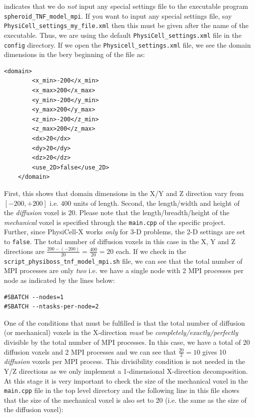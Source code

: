 \documentclass[12pt]{article}
\begin{document}
indicates that we do \textit{not} input any special settings file to the executable program \texttt{spheroid\_TNF\_model\_mpi}. If you want to input any special settings file, say \texttt{PhysiCell\_settings\_my\_file.xml} then this must be given after the name of the executable. Thus, we are using the default \texttt{PhysiCell\_settings.xml} file in the \texttt{config} directory. If we open the \texttt{Physicell\_settings.xml} file, we see the domain dimensions in the bery beginning of the file as:
\begin{verbatim}
<domain>
		<x_min>-200</x_min>
		<x_max>200</x_max>
		<y_min>-200</y_min>
		<y_max>200</y_max>
		<z_min>-200</z_min>
		<z_max>200</z_max>
		<dx>20</dx>
		<dy>20</dy>
		<dz>20</dz>
		<use_2D>false</use_2D>
	</domain>    
\end{verbatim}
First, this shows that domain dimensions in the X/Y and Z direction vary from $[-200,+200]$ i.e. $400$ units of length. Second, the length/width and height of the \textit{diffusion} voxel is $20$. Please note that the length/breadth/height of the \textit{mechanical} voxel is specified through the \texttt{main.cpp} of the specific project. Further, since PhysiCell-X works \textit{only} for 3-D problems, the 2-D settings are set to \texttt{false}. The total number of diffusion voxels in this case in the X, Y and Z directions are $\frac{200-(-200)}{20} = \frac{400}{20} = 20$ each. If we check in the \texttt{script\_physiboss\_tnf\_model\_mpi.sh} file, we can see that the total number of MPI processes are only \textit{two} i.e. we have a single node with 2 MPI processes per node as indicated by the lines below:
\begin{verbatim}
#SBATCH --nodes=1
#SBATCH --ntasks-per-node=2
\end{verbatim}
One of the conditions that must be fulfilled is that the total number of diffusion (or mechanical) voxels in the X-direction \textit{must} be \textit{completely/exactly/perfectly} divisible by the total number of MPI processes. In this case, we have a total of 20 diffusion voxels and 2 MPI processes and we can see that $\frac{20}{2} = 10$ gives 10 \textit{diffusion} voxels per MPI process. This divisibility condition is not needed in the Y/Z directions as we only implement a 1-dimensional X-direction decomposition. At this stage it is very important to check the size of the mechanical voxel in the \texttt{main.cpp} file in the top level directory and the following line in this file shows that the size of the mechanical voxel is also set to 20 (i.e. the same as the size of the diffusion voxel):
\end{document}
